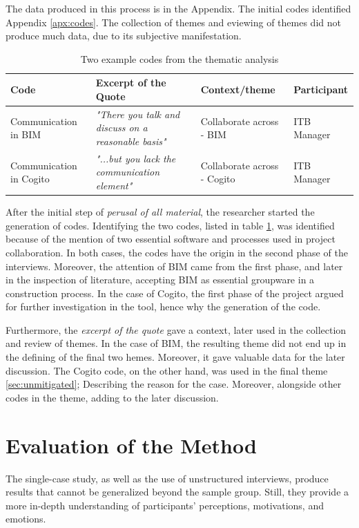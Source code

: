 The data produced in this process is in the Appendix. The initial codes identified Appendix \ref{apx:codes}. The collection of themes and eviewing of themes did not produce much data, due to its subjective manifestation. 

\begin{table}[]
    \centering
    \begin{tabular}{p{}p{}p{}l}
    \toprule
    \textbf{Code}           & \textbf{Excerpt of the Quote}                      & \textbf{Context/theme}      & \textbf{Participant} \\ \midrule
    Communication in BIM    & \textit{"There you talk and discuss on a reasonable basis"} & Collaborate across - BIM    & ITB Manager          \\
    Communication in Cogito & \textit{"...but you lack the communication element"}        & Collaborate across - Cogito & ITB Manager          \\ \bottomrule
    \end{tabular}
    \caption{Two example codes from the thematic analysis}
    \label{tab:code-example}
\end{table}

After the initial step of \textit{perusal of all material}, the researcher started the generation of codes. Identifying the two codes, listed in table \ref{tab:code-example}, was identified because of the mention of two essential software and processes used in project collaboration. In both cases, the codes have the origin in the second phase of the interviews. Moreover, the attention of BIM came from the first phase, and later in the inspection of literature, accepting BIM as essential groupware in a construction process. In the case of Cogito, the first phase of the project argued for further investigation in the tool, hence why the generation of the code.

Furthermore, the \textit{excerpt of the quote} gave a context, later used in the collection and review of themes. In the case of BIM, the resulting theme did not end up in the defining of the final two hemes. Moreover, it gave valuable data for the later discussion. The Cogito code, on the other hand, was used in the final theme \ref{sec:unmitigated}; Describing the reason for the case. Moreover, alongside other codes in the theme, adding to the later discussion. 

\section{Evaluation of the Method}
The single-case study, as well as the use of unstructured interviews, produce results that cannot be generalized beyond the sample group. Still, they provide a more in-depth understanding of participants’ perceptions, motivations, and emotions. 

